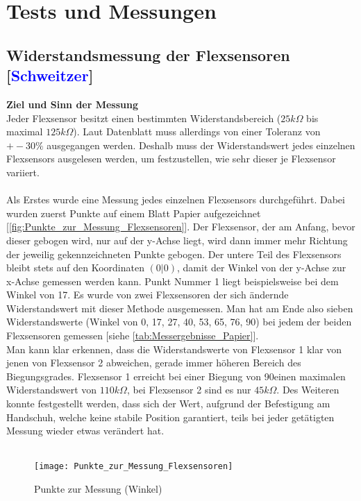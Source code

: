 \documentclass[titlepage,12pt,twoside]{article}
\begin{document}
\section{Tests und Messungen}
\subsection{Widerstandsmessung der Flexsensoren [\textcolor{blue}{Schweitzer}]}
\textbf{Ziel und Sinn der Messung} \\
Jeder Flexsensor besitzt einen bestimmten Widerstandsbereich ($25k\Omega$ bis maximal $125k\Omega$). Laut Datenblatt muss allerdings von einer Toleranz von $+-30\%$ ausgegangen 
werden. Deshalb muss der Widerstandswert jedes einzelnen Flexsensors ausgelesen werden, um festzustellen, wie sehr dieser je Flexsensor variiert. \\
\\
Als Erstes wurde eine Messung jedes einzelnen Flexsensors durchgeführt. Dabei wurden zuerst Punkte auf einem Blatt Papier aufgezeichnet [\textcolor{blue}{\autoref{fig:Punkte_zur_Messung_Flexsensoren}}]. 
Der Flexsensor, der am Anfang, bevor dieser gebogen wird, nur auf der y-Achse liegt, wird dann immer mehr Richtung der jeweilig gekennzeichneten Punkte gebogen. 
Der untere Teil des Flexsensors bleibt stets auf den Koordinaten $(0|0)$, damit der Winkel von der y-Achse zur x-Achse gemessen werden kann. Punkt Nummer 1 liegt 
beispielsweise bei dem Winkel von 17\textdegree. Es wurde von zwei Flexsensoren der sich ändernde Widerstandswert mit dieser Methode ausgemessen. Man hat am Ende also sieben 
Widerstandswerte (Winkel von 0\textdegree, 17\textdegree, 27\textdegree, 40\textdegree, 53\textdegree, 65\textdegree, 76\textdegree, 90\textdegree) bei jedem der beiden Flexsensoren gemessen [siehe \textcolor{blue}{\autoref{tab:Messergebnisse_Papier}}]. \\
Man kann klar erkennen, dass die Widerstandswerte von Flexsensor 1 klar von jenen von Flexsensor 2 abweichen, gerade immer höheren Bereich des Biegungsgrades. 
Flexsensor 1 erreicht bei einer Biegung von 90\textdegree einen maximalen Widerstandswert von $110k\Omega$, bei Flexsensor 2 sind es nur $45k\Omega$. Des Weiteren konnte festgestellt 
werden, dass sich der Wert, aufgrund der Befestigung am Handschuh, welche keine stabile Position garantiert, teils bei jeder getätigten Messung wieder etwas verändert hat. \\
\\
\begin{figure}[H]
	\begin{center}
		\scalebox{0.8}
		{\texttt{[image: Punkte\_zur\_Messung\_Flexsensoren]}}
		\caption{Punkte zur Messung (Winkel)}
		\label{fig:Punkte_zur_Messung_Flexsensoren}				
	\end{center}
\end{figure}
\hfill \break
\end{document}
